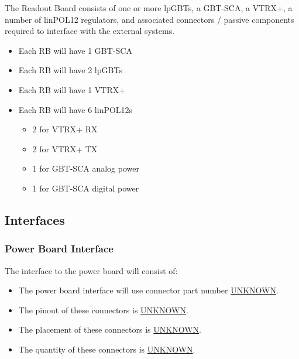 \documentclass[11pt]{article}
\begin{document}
The Readout Board consists of one or more lpGBTs, a GBT-SCA, a VTRX+, a number of linPOL12 regulators, and associated connectors / passive components required to interface with the external systems.

\begin{itemize}
\item Each RB will have 1 GBT-SCA
\item Each RB will have 2 lpGBTs
\item Each RB will have 1 VTRX+
\item Each RB will have 6 linPOL12s
\begin{itemize}
\item 2 for VTRX+ RX
\item 2 for VTRX+ TX
\item 1 for GBT-SCA analog power
\item 1 for GBT-SCA digital power
\end{itemize}
\end{itemize}
\subsection{Interfaces}
\label{sec:org77674c8}
\subsubsection{Power Board Interface}
\label{sec:orgd5012fb}
The interface to the power board will consist of:
\begin{itemize}
\item The power board interface will use connector part number \uline{UNKNOWN}.
\item The pinout of these connectors is \uline{UNKNOWN}.
\item The placement of these connectors is \uline{UNKNOWN}.
\item The quantity of these connectors is \uline{UNKNOWN}.
\end{itemize}
\end{document}

